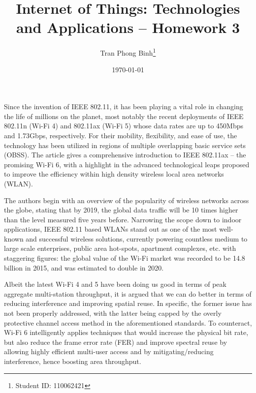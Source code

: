 \documentclass[12pt, a4paper, onside]{article}
\title{\textbf{Internet of Things: Technologies and Applications -- Homework 3}}
\author{Tran Phong Binh\thanks{Student ID: 110062421}}
\affil{Department of Computer Science, National Tsing Hua University}
\date{\today}
\begin{document}
\maketitle

Since the invention of IEEE 802.11, it has been playing a vital role in changing the life of millions on the planet, most notably the recent deployments of IEEE 802.11n (Wi-Fi 4) and 802.11ax (Wi-Fi 5) whose data rates are up to 450Mbps and 1.73Gbps, respectively. For their mobility, flexibility, and ease of use, the technology has been utilized in regions of multiple overlapping basic service sets (OBSS). The article \cite{wifi6} gives a comprehensive introduction to IEEE 802.11ax -- the promising Wi-Fi 6, with a highlight in the advanced technological leaps proposed to improve the efficiency within high density wireless local area networks (WLAN).

The authors begin with an overview of the popularity of wireless networks across the globe, stating that by 2019, the global data traffic will be 10 times higher than the level measured five years before. Narrowing the scope down to indoor applications, IEEE 802.11 based WLANs stand out as one of the most well-known and successful wireless solutions, currently powering countless medium to large scale enterprises, public area hot-spots, apartment complexes, etc. with staggering figures: the global value of the Wi-Fi market was recorded to be 14.8 billion in 2015, and was estimated to double in 2020.

Albeit the latest Wi-Fi 4 and 5 have been doing us good in terms of peak aggregate multi-station throughput, it is argued that we can do better in terms of reducing interference and improving spatial reuse. In specific, the former issue has not been properly addressed, with the latter being capped by the overly protective channel access method in the aforementioned standards. To counteract, Wi-Fi 6 intelligently applies techniques that would increase the physical bit rate, but also reduce the frame error rate (FER) and improve spectral reuse by allowing highly efficient multi-user access and by mitigating/reducing interference, hence boosting area throughput.
\end{document}
